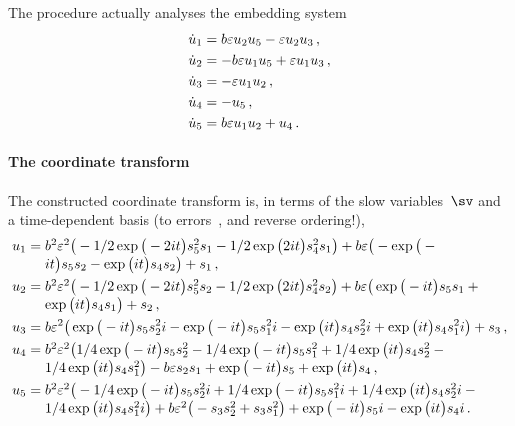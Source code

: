 The procedure actually analyses the embedding system
\begin{align*}&
\dot u_{1}=b \varepsilon u_2 u_5-\varepsilon u_2 u_3
\,, \\& 
\dot u_{2}=-b \varepsilon u_1 u_5+\varepsilon u_1 u_3
\,, \\&
\dot u_{3}=-\varepsilon u_1 u_2
\,, \\&
\dot u_{4}=-u_5
\,, \\&
\dot u_{5}=b \varepsilon u_1 u_2+u_4
\,.
\end{align*}

\paragraph{The coordinate transform} 
The constructed coordinate transform is, in terms of the slow variables~\(\sv\) and a time-dependent basis (to errors~, and reverse ordering!), 
\begin{align*}&
u_{1}=\ParMath{
b^{2} \eps^{2} \big(-1/2 \exp \big(-2 i t\big) s_{5}^{2} s_{1}-1/2
 \exp \big(2 i t\big) s_{4}^{2} s_{1}\big)+b \eps \big(-\exp \big(-i t
\big) s_{5} s_{2}-\exp \big(i t\big) s_{4} s_{2}\big)+s_{1}
\,,} \\&
u_{2}=\ParMath{
b^{2} \eps^{2} \big(-1/2 \exp \big(-2 i t\big) s_{5}^{2} s_{2}-1/2
 \exp \big(2 i t\big) s_{4}^{2} s_{2}\big)+b \eps \big(\exp \big(-i t
\big) s_{5} s_{1}+\exp \big(i t\big) s_{4} s_{1}\big)+s_{2}
\,,} \\&
u_{3}=b \eps^{2} \big(\exp \big(-i t\big) s_{5} s_{2}^{2} i-\exp \big(-i
 t\big) s_{5} s_{1}^{2} i-\exp \big(i t\big) s_{4} s_{2}^{2} i+\exp 
\big(i t\big) s_{4} s_{1}^{2} i\big)+s_{3}
\,, \\&
u_{4}=\ParMath{
b^{2} \eps^{2} \big(1/4 \exp \big(-i t\big) s_{5} s_{2}^{2}-1/4 
\exp \big(-i t\big) s_{5} s_{1}^{2}+1/4 \exp \big(i t\big) s_{4} s_{2}^{
2}-1/4 \exp \big(i t\big) s_{4} s_{1}^{2}\big)-b \eps s_{2} s_{1}+\exp 
\big(-i t\big) s_{5}+\exp \big(i t\big) s_{4}
\,,} \\&
u_{5}=\ParMath{
b^{2} \eps^{2} \big(-1/4 \exp \big(-i t\big) s_{5} s_{2}^{2} i+1/4
 \exp \big(-i t\big) s_{5} s_{1}^{2} i+1/4 \exp \big(i t\big) s_{4} s_{2
}^{2} i-1/4 \exp \big(i t\big) s_{4} s_{1}^{2} i\big)+b \eps^{2} \big(-s
_{3} s_{2}^{2}+s_{3} s_{1}^{2}\big)+\exp \big(-i t\big) s_{5} i-\exp 
\big(i t\big) s_{4} i
\,.}
\end{align*}

